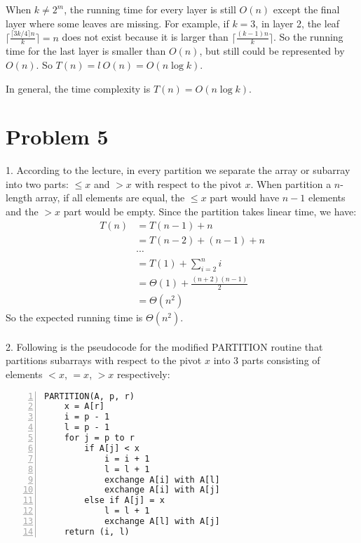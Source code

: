 \documentclass[twoside,11pt]{homework}
\begin{document}
When $k \neq 2^m$, the running time for every layer is still $O(n)$ except the final layer where some leaves are missing.
For example, if $k = 3$, in layer 2, the leaf $\lceil \frac{\lceil {3k/4}\rceil n}{k} \rceil = n$ does not exist because it is larger than $\lceil \frac{(k-1)n}{k} \rceil$.
So the running time for the last layer is smaller than $O(n)$, but still could be represented by $O(n)$.
So $T(n) = l\ O(n) = O(n \log k)$.

In general,  the time complexity is $T(n) = O(n \log k)$. 

\section*{Problem 5}
1.
According to the lecture, in every partition we separate the array or subarray into two parts: $\le x$ and $>x$ with respect to the pivot $x$.
When partition a $n$-length array, if all elements are equal, the $\le x$ part would have $n-1$ elements and the $>x$ part would be empty. 
Since the partition takes linear time, we have:
%
\begin{equation}
\begin{split}
 T(n) &= T(n-1) + n \\
         &= T(n-2) + (n-1) + n \\
         & \cdots \\
         &= T(1) + \sum_{i=2}^{n} i \\
         &= \Theta(1) + \frac{(n+2)(n-1)}{2} \\
         & = \Theta (n^2)
\end{split}
\end{equation}
%
So the expected running time is $\Theta (n^2)$.
\\\\
2.
Following is the pseudocode for the modified PARTITION routine that partitions subarrays with respect to the pivot $x$ into 3 parts consisting of elements $<x$, $=x$, $>x$ respectively:
\begin{colorboxed}
\begin{lstlisting}[language={[ANSI]C},numbers=left,numberstyle=\tiny, frame=single, title=MODIFIED\_PARTITION, breaklines=true,
   rulesepcolor=\color{red!20!green!20!blue!20},
   keywordstyle=\color{blue!70!black},
   commentstyle=\color{blue!90!},
   basicstyle=\ttfamily]
PARTITION(A, p, r)
	x = A[r]
	i = p - 1
	l = p - 1
	for j = p to r
		if A[j] < x
			i = i + 1
			l = l + 1
			exchange A[i] with A[l]
			exchange A[i] with A[j]
		else if A[j] = x
			l = l + 1
			exchange A[l] with A[j]
	return (i, l)   
\end{lstlisting}
\end{colorboxed}   
 
\end{document}

